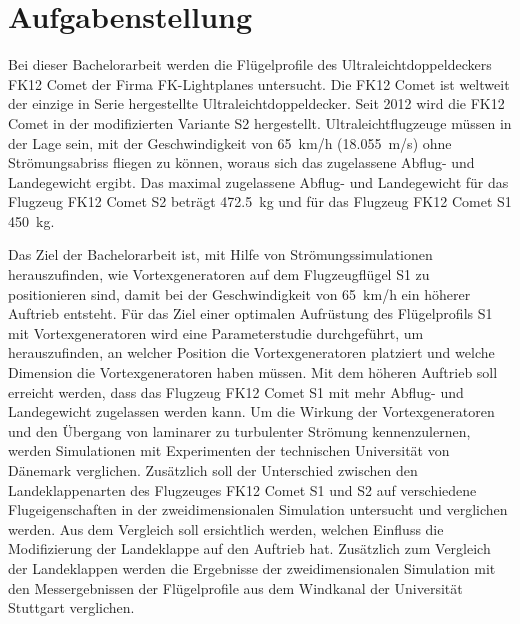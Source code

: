 \section{Aufgabenstellung}
\label{sec:aufgabenstellung}

Bei dieser Bachelorarbeit werden die Flügelprofile des Ultraleichtdoppeldeckers FK12 Comet der Firma FK-Lightplanes untersucht. Die FK12 Comet ist weltweit der einzige in Serie hergestellte Ultraleichtdoppeldecker. Seit 2012 wird die FK12 Comet in der modifizierten Variante S2 hergestellt.  
Ultraleichtflugzeuge müssen in der Lage sein, mit der Geschwindigkeit von \SI{65}{km/h} (\SI{18.055}{m/s}) ohne Strömungsabriss fliegen zu können, woraus sich das zugelassene Abflug- und Landegewicht ergibt. Das maximal zugelassene Abflug- und Landegewicht für  das Flugzeug FK12 Comet S2 beträgt \SI{472.5}{\kilogram} und für das Flugzeug FK12 Comet S1 \SI{450}{\kilogram}.

Das Ziel der Bachelorarbeit ist, mit Hilfe von Strömungssimulationen herauszufinden, wie Vortexgeneratoren auf dem Flugzeugflügel S1 zu positionieren sind, damit bei der Geschwindigkeit von \SI{65}{km/h} ein höherer Auftrieb entsteht. Für das Ziel einer optimalen Aufrüstung des Flügelprofils S1 mit Vortexgeneratoren wird eine Parameterstudie durchgeführt, um herauszufinden, an welcher Position die Vortexgeneratoren platziert und welche Dimension die Vortexgeneratoren haben müssen. Mit dem höheren Auftrieb soll erreicht werden, dass das Flugzeug FK12 Comet S1 mit mehr Abflug- und Landegewicht zugelassen werden kann. Um die Wirkung der Vortexgeneratoren und den Übergang von laminarer zu turbulenter Strömung kennenzulernen, werden Simulationen mit Experimenten der technischen Universität von Dänemark \cite{Backus67} verglichen.
Zusätzlich soll der Unterschied zwischen den Landeklappenarten des Flugzeuges FK12 Comet S1 und S2 auf verschiedene Flugeigenschaften in der zweidimensionalen Simulation untersucht und verglichen werden. Aus dem Vergleich soll ersichtlich werden, welchen Einfluss die Modifizierung der Landeklappe auf den Auftrieb hat. Zusätzlich zum Vergleich der Landeklappen werden die Ergebnisse der zweidimensionalen Simulation mit den Messergebnissen der Flügelprofile aus dem Windkanal der Universität Stuttgart \cite{Bay00} verglichen. 
\newpage

